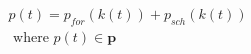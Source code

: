 \begin{equation}
\begin{split}
	p(t) = p_{for}(k(t)) + p_{sch}(k(t))\\
	\text{ where } p(t) \in \textbf{p}
\end{split}
\label{ch2:equ:notation-simplification}
\end{equation}